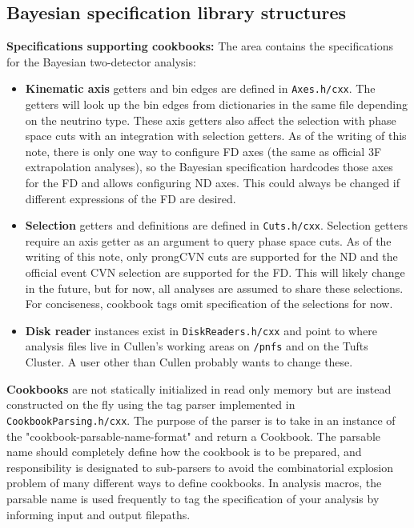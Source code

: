 \documentclass{article}
\begin{document}
\subsection{Bayesian specification library structures}
\label{sec:bayesian-specification-library-structures}
\textbf{Specifications supporting cookbooks:} The area contains the specifications for the Bayesian two-detector analysis:
\begin{itemize}
    \item \textbf{Kinematic axis} getters and bin edges are defined in \texttt{Axes.h/cxx}. The getters will look up the bin edges from dictionaries in the same file depending on the neutrino type. These axis getters also affect the selection with phase space cuts with an integration with selection getters. As of the writing of this note, there is only one way to configure FD axes (the same as official 3F extrapolation analyses), so the Bayesian specification hardcodes those axes for the FD and allows configuring ND axes. This could always be changed if different expressions of the FD are desired.
    \item \textbf{Selection} getters and definitions are defined in \texttt{Cuts.h/cxx}. Selection getters require an axis getter as an argument to query phase space cuts. As of the writing of this note, only prongCVN cuts are supported for the ND and the official event CVN selection are supported for the FD. This will likely change in the future, but for now, all analyses are assumed to share these selections. For conciseness, cookbook tags omit specification of the selections for now.
    \item \textbf{Disk reader} instances exist in \texttt{Disk\-Readers\-.h/cxx} and point to where analysis files live in Cullen's working areas on \texttt{/pnfs} and on the Tufts Cluster. A user other than Cullen probably wants to change these.
\end{itemize}

\textbf{Cookbooks} are not statically initialized in read only memory but are instead constructed on the fly using the tag parser implemented in \texttt{CookbookParsing.h/cxx}. The purpose of the parser is to take in an instance of the "cookbook-parsable-name-format" and return a Cookbook. The parsable name should completely define how the cookbook is to be prepared, and responsibility is designated to sub-parsers to avoid the combinatorial explosion problem of many different ways to define cookbooks. In analysis macros, the parsable name is used frequently to tag the specification of your analysis by informing input and output filepaths.
\end{document}

